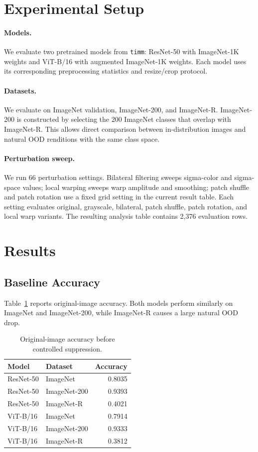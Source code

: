 \documentclass[letterpaper]{article}
\begin{document}
\section{Experimental Setup}

\paragraph{Models.}
We evaluate two pretrained models from \texttt{timm}: ResNet-50 with ImageNet-1K
weights and ViT-B/16 with augmented ImageNet-1K weights. Each model uses its
corresponding preprocessing statistics and resize/crop protocol.

\paragraph{Datasets.}
We evaluate on ImageNet validation, ImageNet-200, and ImageNet-R. ImageNet-200
is constructed by selecting the 200 ImageNet classes that overlap with
ImageNet-R. This allows direct comparison between in-distribution images and
natural OOD renditions with the same class space.

\paragraph{Perturbation sweep.}
We run 66 perturbation settings. Bilateral filtering sweeps sigma-color and
sigma-space values; local warping sweeps warp amplitude and smoothing; patch
shuffle and patch rotation use a fixed grid setting in the current result
table. Each setting evaluates original, grayscale, bilateral, patch shuffle,
patch rotation, and local warp variants. The resulting analysis table contains
2,376 evaluation rows.

\section{Results}

\subsection{Baseline Accuracy}

Table~\ref{tab:base} reports original-image accuracy. Both models perform
similarly on ImageNet and ImageNet-200, while ImageNet-R causes a large natural
OOD drop.

\begin{table}[t]
\centering
\small
\begin{tabular}{llr}
\toprule
Model & Dataset & Accuracy \\
\midrule
ResNet-50 & ImageNet & 0.8035 \\
ResNet-50 & ImageNet-200 & 0.9393 \\
ResNet-50 & ImageNet-R & 0.4021 \\
ViT-B/16 & ImageNet & 0.7914 \\
ViT-B/16 & ImageNet-200 & 0.9333 \\
ViT-B/16 & ImageNet-R & 0.3812 \\
\bottomrule
\end{tabular}
\caption{Original-image accuracy before controlled suppression.}
\label{tab:base}
\end{table}
\end{document}

